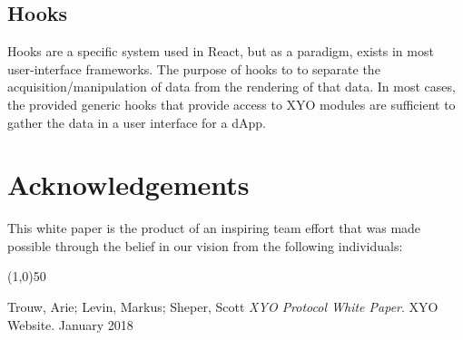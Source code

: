 \documentclass{article}
\begin{document}
\subsection{Hooks}

Hooks are a specific system used in React, but as a paradigm, exists in most user-interface frameworks.  The purpose of hooks to to separate the acquisition/manipulation of data from the rendering of that data.  In most cases, the provided generic hooks that provide access to XYO modules are sufficient to gather the data in a user interface for a dApp.


\section {Acknowledgements}
This white paper is the product of an inspiring team effort that was made possible through the belief in our vision from the following individuals: 

\begin{center}
    \line(1,0){50}
\end{center}



\begin{thebibliography}{9}

    Trouw, Arie; Levin, Markus; Sheper, Scott
    \textit{XYO Protocol White Paper}.
    XYO Website. January 2018

\end{thebibliography}

\clearpage

\printglossaries

\end{document}
